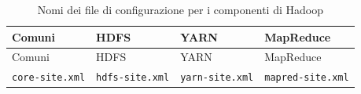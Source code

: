 \documentclass[italian,a4paper, twoside, 12pt]{report}
\begin{document}
\begin{longtable}[]{@{}llll@{}}
\caption{Nomi dei file di configurazione per i componenti di
Hadoop}\tabularnewline
\toprule
\begin{minipage}[b]{0.22\columnwidth}\raggedright\strut
Comuni\strut
\end{minipage} & \begin{minipage}[b]{0.22\columnwidth}\raggedright\strut
HDFS\strut
\end{minipage} & \begin{minipage}[b]{0.22\columnwidth}\raggedright\strut
YARN\strut
\end{minipage} & \begin{minipage}[b]{0.24\columnwidth}\raggedright\strut
MapReduce\strut
\end{minipage}\tabularnewline
\midrule
\endfirsthead
\toprule
\begin{minipage}[b]{0.22\columnwidth}\raggedright\strut
Comuni\strut
\end{minipage} & \begin{minipage}[b]{0.22\columnwidth}\raggedright\strut
HDFS\strut
\end{minipage} & \begin{minipage}[b]{0.22\columnwidth}\raggedright\strut
YARN\strut
\end{minipage} & \begin{minipage}[b]{0.24\columnwidth}\raggedright\strut
MapReduce\strut
\end{minipage}\tabularnewline
\midrule
\endhead
\begin{minipage}[t]{0.22\columnwidth}\raggedright\strut
\texttt{core-site.xml}\strut
\end{minipage} & \begin{minipage}[t]{0.22\columnwidth}\raggedright\strut
\texttt{hdfs-site.xml}\strut
\end{minipage} & \begin{minipage}[t]{0.22\columnwidth}\raggedright\strut
\texttt{yarn-site.xml}\strut
\end{minipage} & \begin{minipage}[t]{0.24\columnwidth}\raggedright\strut
\texttt{mapred-site.xml}\strut
\end{minipage}\tabularnewline
\bottomrule
\end{longtable}
\end{document}
